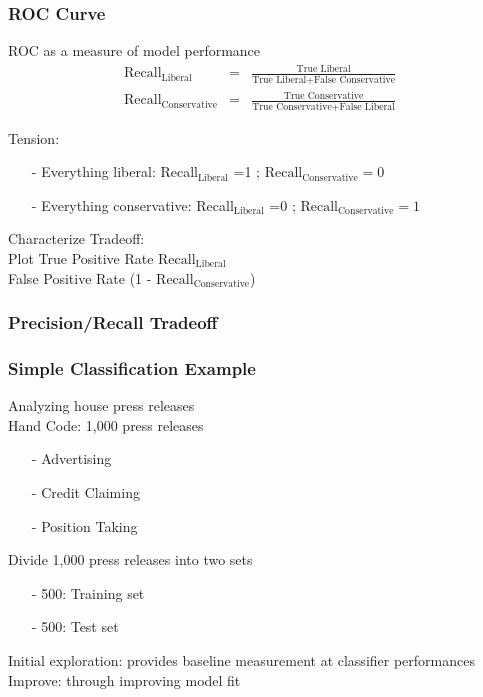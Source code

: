 \documentclass{beamer}
\begin{document}
\begin{frame}
\frametitle{ROC Curve} 

ROC as a measure of model performance
\begin{eqnarray}
\text{Recall}_{\text{Liberal}} & = & \frac{\text{True Liberal}  } {\text{True Liberal} + \text{False Conservative}  }\nonumber \\
\text{Recall}_{\text{Conservative}} & =  & \frac{\text{True Conservative}  } {\text{True Conservative} + \text{False Liberal}  }\nonumber 
\end{eqnarray}

\alert{Tension}:
\begin{itemize}
\item[-] Everything liberal: Recall$_{\text{Liberal}}$ =1 ; $\text{Recall}_{\text{Conservative}}=0$
\item[-] Everything conservative: Recall$_{\text{Liberal}}$ =0 ; $\text{Recall}_{\text{Conservative}}=1$
\end{itemize}

Characterize Tradeoff: \\
Plot True Positive Rate $\text{Recall}_{\text{Liberal}}$ \\
 False Positive Rate (1 - $\text{Recall}_{\text{Conservative}}$) 



\end{frame}




\begin{frame}
\frametitle{Precision/Recall Tradeoff} 



\end{frame}

\begin{frame}
\frametitle{Simple Classification Example}

Analyzing house press releases\\
\alert{Hand Code}: 1,000 press releases
\begin{itemize}
\item[-] Advertising
\item[-] Credit Claiming
\item[-] Position Taking
\end{itemize}
Divide 1,000 press releases into two sets
\begin{itemize}
\item[-] 500: Training set
\item[-] 500: Test set
\end{itemize}

\alert{Initial exploration}: provides baseline measurement at classifier performances \\
\alert{Improve}: through improving model fit
\end{frame}
\end{document}
